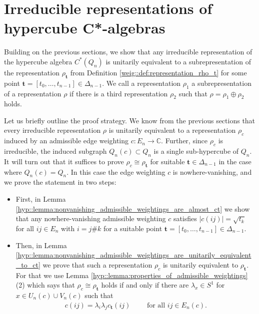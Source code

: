 \documentclass[a4paper]{amsart}
\newcommand{\C}{\mathbb{C}}
\begin{document}
\section{Irreducible representations of hypercube C*-algebras}
\label{sec::irreducible_representations}

Building on the previous sections, we show that any irreducible representation of the hypercube algebra $C^\ast(Q_n)$ is unitarily equivalent to a subrepresentation of the representation $\rho_\mathbf{t}$ from Definition \ref{weig::def:representation_rho_t} for some point $\mathbf{t} = [t_0, \dots, t_{n-1}] \in \Delta_{n-1}$. We call a representation $\rho_1$ a subrepresentation of a representation $\rho$ if there is a third representation $\rho_2$ such that $\rho = \rho_1 \oplus \rho_2$ holds.

Let us briefly outline the proof strategy. We know from the previous sections that every irreducible representation $\rho$ is unitarily equivalent to a representation $\rho_c$ induced by an admissible edge weighting $c: E_n \to \C$. Further, since $\rho_c$ is irreducible, the induced subgraph $Q_n(c) \subset Q_n$ is a single sub-hypercube of $Q_n$. It will turn out that it suffices to prove $\rho_c \cong \rho_\mathbf{t}$ for suitable $\mathbf{t} \in \Delta_{n-1}$ in the case where $Q_n(c) = Q_n$. In this case the edge weighting $c$ is nowhere-vanishing, and we prove the statement in two steps:


\begin{itemize}
    \item First, in Lemma \ref{hyp::lemma:nonvanishing_admissible_weightings_are_almost_ct} we show that any nowhere-vanishing admissible weighting $c$ satisfies $|c(ij)| = \sqrt{t_k}$ for all $ij \in E_n$ with $i = j \# k$ for a suitable point $\mathbf{t} = [t_0, \dots, t_{n-1}] \in \Delta_{n-1}$.
    \item Then, in Lemma \ref{hyp::lemma:nonvanishing_admissible_weightings_are_unitarily_equivalent_to_ct} we prove that such a representation $\rho_c$ is unitarily equivalent to $\rho_\mathbf{t}$. For that we use Lemma \ref{hyp::lemma:properties_of_admissible_weightings}(2) which says that $\rho_c \cong \rho_\mathbf{t}$ holds if and only if there are $\lambda_x \in S^1$ for $x \in U_n(c) \cup V_n(c)$ such that
    \begin{align*}
        c(ij) = \lambda_i \lambda_j c_\mathbf{t}(ij) \qquad \text{ for all } ij \in E_n(c).
    \end{align*}
\end{itemize}
\end{document}

